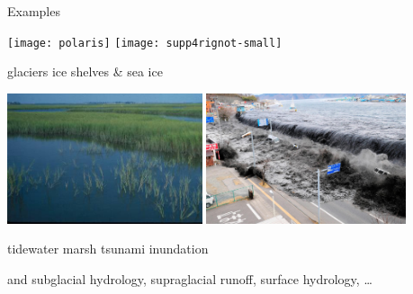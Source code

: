 \documentclass{beamer}
\begin{document}
\begin{frame}{Examples}

\texttt{[image: polaris]}
\hfill
\texttt{[image: supp4rignot-small]}

\small glaciers \hfill ice shelves \& sea ice

\medskip
\includegraphics[width=0.43\textwidth,keepaspectratio=true]{marsh-water}
\hfill
\includegraphics[width=0.44\textwidth,keepaspectratio=true]{tsunami-sendai}

\small tidewater marsh \hfill tsunami inundation


\medskip
\scriptsize and subglacial hydrology, supraglacial runoff, surface hydrology, \dots


\end{frame}
\end{document}
